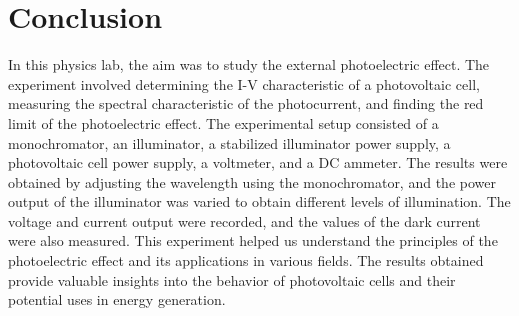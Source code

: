 \section{Conclusion}

In this physics lab, the aim was to study the external photoelectric effect. The experiment involved determining the I-V characteristic of a photovoltaic cell, measuring the spectral characteristic of the photocurrent, and finding the red limit of the photoelectric effect. The experimental setup consisted of a monochromator, an illuminator, a stabilized illuminator power supply, a photovoltaic cell power supply, a voltmeter, and a DC ammeter. The results were obtained by adjusting the wavelength using the monochromator, and the power output of the illuminator was varied to obtain different levels of illumination. The voltage and current output were recorded, and the values of the dark current were also measured. This experiment helped us understand the principles of the photoelectric effect and its applications in various fields. The results obtained provide valuable insights into the behavior of photovoltaic cells and their potential uses in energy generation.